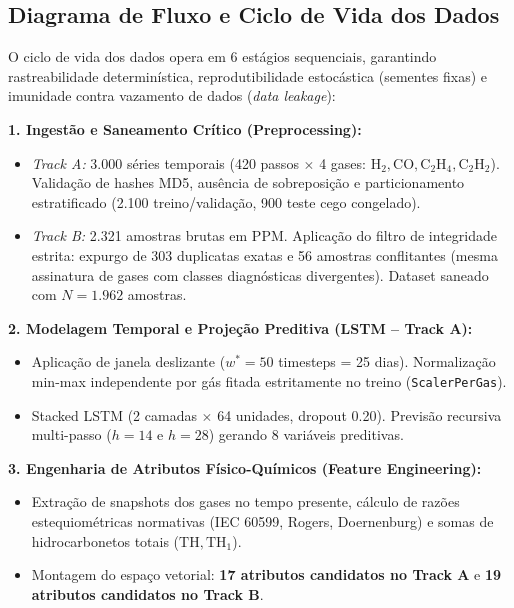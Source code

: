 \documentclass[10pt,a4paper]{article}
\begin{document}
\subsection{Diagrama de Fluxo e Ciclo de Vida dos Dados}

O ciclo de vida dos dados opera em 6 estágios sequenciais, garantindo rastreabilidade determinística, reprodutibilidade estocástica (sementes fixas) e imunidade contra vazamento de dados (\textit{data leakage}):

\begin{archbox}
\textbf{1. Ingestão e Saneamento Crítico (Preprocessing):}
\begin{itemize}[leftmargin=*,itemsep=0pt]
  \item \textit{Track A:} 3.000 séries temporais (420 passos $\times$ 4 gases: $\text{H}_2, \text{CO}, \text{C}_2\text{H}_4, \text{C}_2\text{H}_2$). Validação de hashes MD5, ausência de sobreposição e particionamento estratificado (2.100 treino/validação, 900 teste cego congelado).
  \item \textit{Track B:} 2.321 amostras brutas em PPM. Aplicação do filtro de integridade estrita: expurgo de 303 duplicatas exatas e 56 amostras conflitantes (mesma assinatura de gases com classes diagnósticas divergentes). Dataset saneado com $N=1.962$ amostras.
\end{itemize}

\textbf{2. Modelagem Temporal e Projeção Preditiva (LSTM -- Track A):}
\begin{itemize}[leftmargin=*,itemsep=0pt]
  \item Aplicação de janela deslizante ($w^*=50$ timesteps = 25 dias). Normalização min-max independente por gás fitada estritamente no treino (\texttt{ScalerPerGas}).
  \item Stacked LSTM (2 camadas $\times$ 64 unidades, dropout 0.20). Previsão recursiva multi-passo ($h=14$ e $h=28$) gerando 8 variáveis preditivas.
\end{itemize}

\textbf{3. Engenharia de Atributos Físico-Químicos (Feature Engineering):}
\begin{itemize}[leftmargin=*,itemsep=0pt]
  \item Extração de snapshots dos gases no tempo presente, cálculo de razões estequiométricas normativas (IEC 60599, Rogers, Doernenburg) e somas de hidrocarbonetos totais ($\text{TH}, \text{TH}_1$).
  \item Montagem do espaço vetorial: \textbf{17 atributos candidatos no Track A} e \textbf{19 atributos candidatos no Track B}.
\end{itemize}


\end{archbox}
\end{document}
